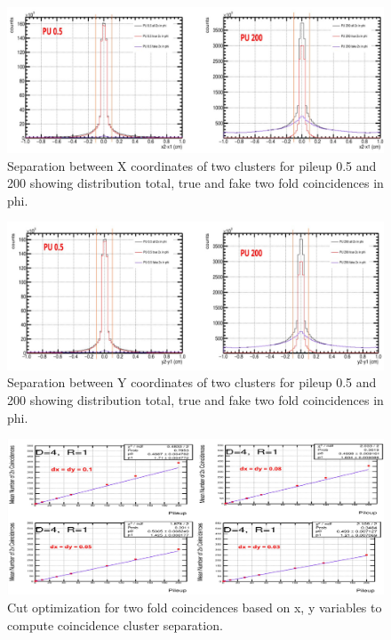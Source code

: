 \begin{figure}[!htp]
\centering
\includegraphics[width=1\textwidth]{ashish_thesis/twofoldcoin_inphi_PU0p5_200.png}
\caption{%
 Separation between X coordinates of two clusters for pileup 0.5 and 200 showing distribution total, true and fake two fold coincidences in phi.
}
\label{fig:dx_twofold}
\end{figure}



\begin{figure}[!htp]
\centering
\includegraphics[width=1\textwidth]{ashish_thesis/twofoldcoin_cluster_y.png}
\caption{%
    Separation between Y coordinates of two clusters for pileup 0.5 and 200 showing distribution total, true and fake two fold coincidences in phi.
}
\label{fig:dy_twofold}
\end{figure}




\begin{figure}[!htp]
\centering
\includegraphics[width=1\textwidth]{ashish_thesis/cut_optimization_twofoldcoin.png}
\caption{%
 Cut optimization for two fold coincidences based on x, y variables to compute coincidence cluster separation.
}
\label{fig:cutopdxdy}
\end{figure}



